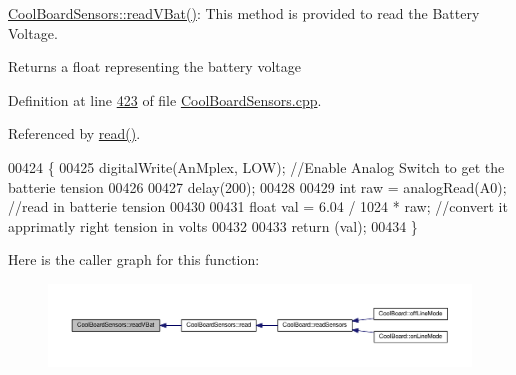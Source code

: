 \hyperlink{class_cool_board_sensors_a6944b6ea7bce8e2fce1b434acfd9d5f3}{Cool\+Board\+Sensors\+::read\+V\+Bat()}\+: This method is provided to read the Battery Voltage.

\begin{DoxyReturn}{Returns}
a float representing the battery voltage 
\end{DoxyReturn}


Definition at line \hyperlink{_cool_board_sensors_8cpp_source_l00423}{423} of file \hyperlink{_cool_board_sensors_8cpp_source}{Cool\+Board\+Sensors.\+cpp}.



Referenced by \hyperlink{_cool_board_sensors_8cpp_source_l00123}{read()}.


\begin{DoxyCode}
00424 \{
00425     digitalWrite(AnMplex, LOW);                                  \textcolor{comment}{//Enable Analog Switch to get the batterie
       tension}
00426     
00427     delay(200);
00428     
00429     \textcolor{keywordtype}{int} raw = analogRead(A0);                                    \textcolor{comment}{//read in batterie tension}
00430     
00431     \textcolor{keywordtype}{float} val = 6.04 / 1024 * raw;                               \textcolor{comment}{//convert it apprimatly right tension in
       volts}
00432 
00433     \textcolor{keywordflow}{return} (val);   
00434 \}
\end{DoxyCode}
Here is the caller graph for this function\+:
\nopagebreak
\begin{figure}[H]
\begin{center}
\leavevmode
\includegraphics[width=350pt]{class_cool_board_sensors_a6944b6ea7bce8e2fce1b434acfd9d5f3_icgraph}
\end{center}
\end{figure}
\mbox{\label{class_cool_board_sensors_a406307ffd70272282d91479c7ed8d66f}} 
